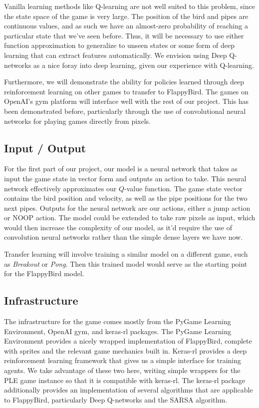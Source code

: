 \documentclass{article}
\begin{document}
Vanilla learning methods like Q-learning are not well suited to this problem, since the state space of the game is very large. The position of the bird and pipes are continuous values, and as such we have an almost-zero probability of reaching a particular state that we've seen before.
Thus, it will be necessary to use either function approximation to generalize to unseen states or some form of deep learning that can extract features automatically.
We envision using Deep Q-networks as a nice foray into deep learning, given our experience with Q-learning.

Furthermore, we will demonstrate the ability for policies learned through deep reinforcement learning on  other games to transfer to FlappyBird.
The games on OpenAI's gym platform will interface well with the rest of our project. \cite{openaigym} \cite{ale}
This has been demonstrated before, particularly through the use of convolutional neural networks for playing games directly from pixels. \cite{deepmind}


\subsection{Input / Output}

For the first part of our project, our model is a neural network that takes as input the game state in vector form and outputs an action to take. 
This neural network effectively approximates our $Q$-value function.
The game state vector contains the bird position and velocity, as well as the pipe positions for the two next pipes.
Outputs for the neural network are our actions, either a jump action or NOOP action.
The model could be extended to take raw pixels as input, which would then increase the complexity of our model, as it'd require the use of convolution neural networks rather than the simple dense layers we have now.

Transfer learning will involve training a similar model on a different game, such as \textit{Breakout} or \textit{Pong}.
Then this trained model would serve as the starting point for the FlappyBird model.

\subsection{Infrastructure}

The infrastructure for the game comes mostly from the PyGame Learning Environment, OpenAI gym, and keras-rl packages. 
The PyGame Learning Environment provides a nicely wrapped implementation of FlappyBird, complete with sprites and the relevant game mechanics built in. \cite{ple}
Keras-rl provides a deep reinforcement learning framework that gives us a simple interface for training agents. 
We take advantage of these two here, writing simple wrappers for the PLE game instance so that it is compatible with keras-rl. \cite{kerasrl}
The keras-rl package additionally provides an implementation of several algorithms that are applicable to FlappyBird, particularly Deep Q-networks and the SARSA algorithm. 
\end{document}
